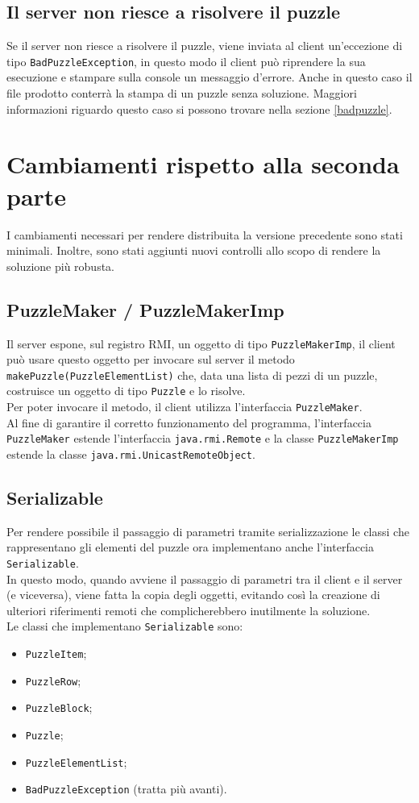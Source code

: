 \documentclass[a4paper, 12pt]{article}
\begin{document}
\subsection{Il server non riesce a risolvere il puzzle}
Se il server non riesce a risolvere il puzzle, viene inviata al client un'eccezione di tipo \texttt{BadPuzzleException}, in questo modo il client può riprendere la sua esecuzione e stampare sulla console un messaggio d'errore. Anche in questo caso il file prodotto conterrà la stampa di un puzzle senza soluzione. Maggiori informazioni riguardo questo caso si possono trovare nella sezione \ref{badpuzzle}.


\section{Cambiamenti rispetto alla seconda parte}
I cambiamenti necessari per rendere distribuita la versione precedente sono stati minimali. Inoltre, sono stati aggiunti nuovi controlli allo scopo di rendere la soluzione più robusta.

\subsection{PuzzleMaker / PuzzleMakerImp}
Il server espone, sul registro RMI, un oggetto di tipo \texttt{PuzzleMakerImp}, il client può usare questo oggetto per invocare sul server il metodo \texttt{makePuzzle(PuzzleElementList)} che, data una lista di pezzi di un puzzle, costruisce un oggetto di tipo \texttt{Puzzle} e lo risolve. \\
Per poter invocare il metodo, il client utilizza l'interfaccia \texttt{PuzzleMaker}. \\
Al fine di garantire il corretto funzionamento del programma, l'interfaccia \texttt{PuzzleMaker} estende l'interfaccia \texttt{java.rmi.Remote} e la classe \texttt{PuzzleMakerImp} estende la classe \texttt{java.rmi.UnicastRemoteObject}.

\subsection{Serializable}\label{serial}
Per rendere possibile il passaggio di parametri tramite serializzazione le classi che rappresentano gli elementi del puzzle ora implementano anche l'interfaccia \texttt{Serializable}.\\
In questo modo, quando avviene il passaggio di parametri tra il client e il server (e viceversa), viene fatta la copia degli oggetti, evitando così la creazione di ulteriori riferimenti remoti che complicherebbero inutilmente la soluzione.\\
Le classi che implementano \texttt{Serializable} sono:
\begin{itemize}
\item \texttt{PuzzleItem};
\item \texttt{PuzzleRow};
\item \texttt{PuzzleBlock};
\item \texttt{Puzzle};
\item \texttt{PuzzleElementList};
\item \texttt{BadPuzzleException} (tratta più avanti).
\end{itemize}
\end{document}
